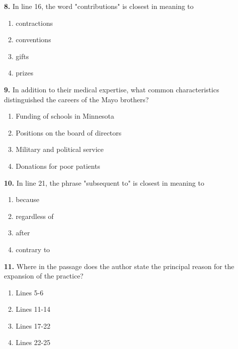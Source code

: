 \documentclass[12pt]{article}
\begin{document}
\vspace{0.25\baselineskip}
\noindent\textbf{8.} In line 16, the word "contributions" is closest in meaning to
\begin{enumerate}[label=(\Alph*),leftmargin=*,itemsep=0.2em]
\item contractions
\item conventions
\item gifts
\item prizes
\end{enumerate}
\par
\vspace{0.25\baselineskip}
\noindent\textbf{9.} In addition to their medical expertise, what common characteristics distinguished the careers of the Mayo brothers?
\begin{enumerate}[label=(\Alph*),leftmargin=*,itemsep=0.2em]
\item Funding of schools in Minnesota
\item Positions on the board of directors
\item Military and political service
\item Donations for poor patients
\end{enumerate}
\par
\vspace{0.25\baselineskip}
\noindent\textbf{10.} In line 21, the phrase "subsequent to" is closest in meaning to
\begin{enumerate}[label=(\Alph*),leftmargin=*,itemsep=0.2em]
\item because
\item regardless of
\item after
\item contrary to
\end{enumerate}
\par
\vspace{0.25\baselineskip}
\noindent\textbf{11.} Where in the passage does the author state the principal reason for the expansion of the practice?
\begin{enumerate}[label=(\Alph*),leftmargin=*,itemsep=0.2em]
\item Lines 5-6
\item Lines 11-14
\item Lines 17-22
\item Lines 22-25
\end{enumerate}
\par
\vspace{0.25\baselineskip}
\end{document}
